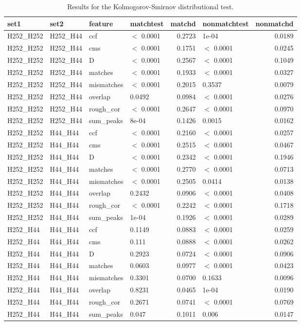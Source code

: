 \documentclass[12pt,]{article}
\theoremstyle{definition}
\theoremstyle{definition}
\theoremstyle{definition}
\theoremstyle{remark}
\begin{document}
\begin{table}[H]
\centering
\begin{tabular}{llllrlr}
  \hline
set1 & set2 & feature & matchtest & matchd & nonmatchtest & nonmatchd \\ 
  \hline
H252\_H252 & H252\_H44 & ccf & $<$ 0.0001 & 0.2723 & 1e-04 & 0.0189 \\ 
  H252\_H252 & H252\_H44 & cms & $<$ 0.0001 & 0.1751 & $<$ 0.0001 & 0.0245 \\ 
  H252\_H252 & H252\_H44 & D & $<$ 0.0001 & 0.2567 & $<$ 0.0001 & 0.1049 \\ 
  H252\_H252 & H252\_H44 & matches & $<$ 0.0001 & 0.1933 & $<$ 0.0001 & 0.0327 \\ 
  H252\_H252 & H252\_H44 & mismatches & $<$ 0.0001 & 0.2015 & 0.3537 & 0.0079 \\ 
  H252\_H252 & H252\_H44 & overlap & 0.0492 & 0.0984 & $<$ 0.0001 & 0.0276 \\ 
  H252\_H252 & H252\_H44 & rough\_cor & $<$ 0.0001 & 0.2647 & $<$ 0.0001 & 0.0970 \\ 
  H252\_H252 & H252\_H44 & sum\_peaks & 8e-04 & 0.1426 & 0.0015 & 0.0162 \\ 
  H252\_H252 & H44\_H44 & ccf & $<$ 0.0001 & 0.2160 & $<$ 0.0001 & 0.0257 \\ 
  H252\_H252 & H44\_H44 & cms & $<$ 0.0001 & 0.2515 & $<$ 0.0001 & 0.0467 \\ 
  H252\_H252 & H44\_H44 & D & $<$ 0.0001 & 0.2342 & $<$ 0.0001 & 0.1946 \\ 
  H252\_H252 & H44\_H44 & matches & $<$ 0.0001 & 0.2770 & $<$ 0.0001 & 0.0713 \\ 
  H252\_H252 & H44\_H44 & mismatches & $<$ 0.0001 & 0.2505 & 0.0414 & 0.0138 \\ 
  H252\_H252 & H44\_H44 & overlap & 0.2432 & 0.0906 & $<$ 0.0001 & 0.0408 \\ 
  H252\_H252 & H44\_H44 & rough\_cor & $<$ 0.0001 & 0.2242 & $<$ 0.0001 & 0.1718 \\ 
  H252\_H252 & H44\_H44 & sum\_peaks & 1e-04 & 0.1926 & $<$ 0.0001 & 0.0289 \\ 
  H252\_H44 & H44\_H44 & ccf & 0.1149 & 0.0883 & $<$ 0.0001 & 0.0259 \\ 
  H252\_H44 & H44\_H44 & cms & 0.111 & 0.0888 & $<$ 0.0001 & 0.0262 \\ 
  H252\_H44 & H44\_H44 & D & 0.2923 & 0.0724 & $<$ 0.0001 & 0.0906 \\ 
  H252\_H44 & H44\_H44 & matches & 0.0603 & 0.0977 & $<$ 0.0001 & 0.0423 \\ 
  H252\_H44 & H44\_H44 & mismatches & 0.3301 & 0.0700 & 0.1633 & 0.0096 \\ 
  H252\_H44 & H44\_H44 & overlap & 0.8231 & 0.0465 & 1e-04 & 0.0190 \\ 
  H252\_H44 & H44\_H44 & rough\_cor & 0.2671 & 0.0741 & $<$ 0.0001 & 0.0769 \\ 
  H252\_H44 & H44\_H44 & sum\_peaks & 0.047 & 0.1011 & 0.006 & 0.0147 \\ 
   \hline
\end{tabular}
\caption{Results for the Kolmogorov-Smirnov distributional test.} 
\label{tab:kstests}
\end{table}
\end{document}
